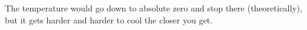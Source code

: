 The temperature would go down to absolute zero and stop there (theoretically), but it gets harder and harder to cool the closer you get.